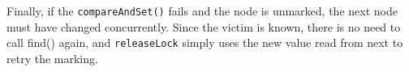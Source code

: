Finally, if the \texttt{compareAndSet()} fails and the node is unmarked, the next node must have changed concurrently.
Since the victim is known, there is no need to call find() again, and \texttt{releaseLock} simply uses the new value read from next to retry the marking.

